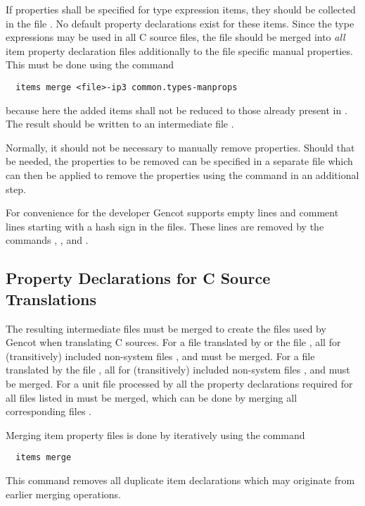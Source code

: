 If properties shall be specified for type expression items, they should be collected in the file .
No default property declarations exist for these items. Since the type expressions may be used in all C source files, the 
file should be merged into \textit{all} item property declaration files additionally to the file specific manual properties.
This must be done using the command
\begin{verbatim}
  items merge <file>-ip3 common.types-manprops
\end{verbatim}
because here the added items shall not be reduced to those already present in . The result 
should be written to an intermediate file .

Normally, it should not be necessary to manually remove properties. Should that be needed, the properties to be removed can
be specified in a separate file which can then be applied to remove the properties using the command  in 
an additional step.

For convenience for the developer Gencot supports empty lines and comment lines starting with a hash sign \code{\#} in the 
 files. These lines are removed by the commands , , and .

\subsection{Property Declarations for C Source Translations}
\label{app-itemprops-unit}

The resulting intermediate files  must be merged to create the files  used 
by Gencot when translating C sources. For a file  translated by  or 
the file , all  for (transitively) included non-system files , and 
must be merged. For a file  translated by 
the file , all  for (transitively) included non-system files , and 
must be merged. For a unit file  processed by  all the property declarations required
for all files  listed in  must be merged, which can be done by merging all corresponding
files .

Merging item property files is done by iteratively using the command
\begin{verbatim}
  items merge
\end{verbatim}
This command removes all duplicate item declarations which may originate from earlier merging operations.

